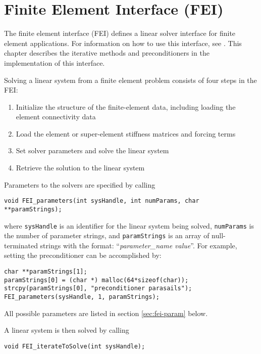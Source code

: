 \chapter{Finite Element Interface (FEI)}
\label{Finite Element Interface}

The finite element interface (FEI) defines a linear solver interface 
for finite element applications.  For information on how to use this
interface, see \cite{FEI-ref}.  
This chapter describes the iterative methods and 
preconditioners in the \hypre{} implementation
of this interface.

Solving a linear system from a finite element problem consists of
four steps in the FEI:
\begin{enumerate}
\item Initialize the structure of the finite-element data,
      including loading the element connectivity data
\item Load the element or super-element stiffness matrices and forcing terms
\item Set solver parameters and solve the linear system
\item Retrieve the solution to the linear system
\end{enumerate}

Parameters to the \hypre{} solvers are specified by calling
\begin{display}
\begin{verbatim}
void FEI_parameters(int sysHandle, int numParams, char **paramStrings);
\end{verbatim}
\end{display}
where {\tt sysHandle} is an identifier for the linear system being solved,
{\tt numParams} is the number of parameter strings, and {\tt paramStrings} is
an array of null-terminated strings with the format: 
``{\em parameter\_name value}''.
For example, setting the preconditioner can be accomplished by:
\begin{display}
\begin{verbatim}
char **paramStrings[1];
paramStrings[0] = (char *) malloc(64*sizeof(char));
strcpy(paramStrings[0], "preconditioner parasails");
FEI_parameters(sysHandle, 1, paramStrings);
\end{verbatim}
\end{display}
All possible parameters are listed in section \ref{sec:fei-param} below.


A linear system is then solved by calling 
\begin{display}
\begin{verbatim}
void FEI_iterateToSolve(int sysHandle);
\end{verbatim}
\end{display}

